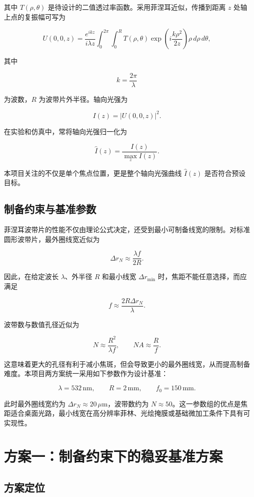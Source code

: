 \documentclass[UTF8,a4paper,11pt]{ctexart}
\begin{document}
其中 $T(\rho,\theta)$ 是待设计的二值透过率函数。采用菲涅耳近似，传播到距离 $z$ 处轴上点的复振幅可写为

\[
U(0,0,z)=
\frac{e^{ikz}}{i\lambda z}
\int_0^{2\pi}
\int_0^R
T(\rho,\theta)
\exp\left(i\frac{k\rho^2}{2z}\right)
\rho\,d\rho\,d\theta,
\]

其中

\[
k=\frac{2\pi}{\lambda}
\]

为波数，$R$ 为波带片外半径。轴向光强为

\[
I(z)=|U(0,0,z)|^2.
\]

在实验和仿真中，常将轴向光强归一化为

\[
\widehat I(z)=\frac{I(z)}{\max_z I(z)}.
\]

本项目关注的不仅是单个焦点位置，更是整个轴向光强曲线 $\widehat I(z)$ 是否符合预设目标。

\subsection{制备约束与基准参数}

菲涅耳波带片的性能不仅由理论公式决定，还受到最小可制备线宽的限制。对标准圆形波带片，最外圈线宽近似为

\[
\Delta r_N \approx \frac{\lambda f}{2R}.
\]

因此，在给定波长 $\lambda$、外半径 $R$ 和最小线宽 $\Delta r_{\min}$ 时，焦距不能任意选择，而应满足

\[
f \approx \frac{2R\Delta r_N}{\lambda}.
\]

波带数与数值孔径近似为

\[
N\approx \frac{R^2}{\lambda f},\qquad
NA\approx \frac{R}{f}.
\]

这意味着更大的孔径有利于减小焦斑，但会导致更小的最外圈线宽，从而提高制备难度。本项目两方案统一采用如下参数作为设计基准：

\[
\lambda=532\,\mathrm{nm},\qquad
R=2\,\mathrm{mm},\qquad
f_0=150\,\mathrm{mm}.
\]

此时最外圈线宽约为 $\Delta r_N\approx 20\,\mu\mathrm{m}$，波带数约为 $N\approx 50$。这一参数组的优点是焦距适合桌面光路，最小线宽在高分辨率菲林、光绘掩膜或基础微加工条件下具有可实现性。

\section{方案一：制备约束下的稳妥基准方案}

\subsection{方案定位}
\end{document}
